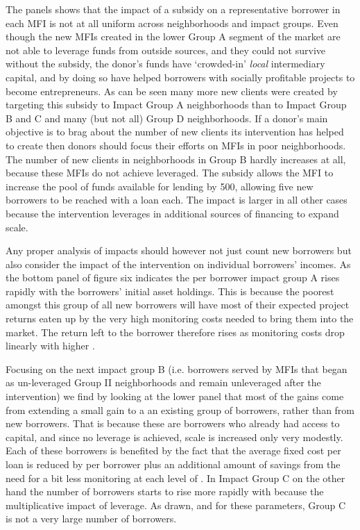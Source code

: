 \documentclass{article}
\begin{document}
The panels shows that the impact of a subsidy on a representative
borrower in each MFI is not at all uniform across neighborhoods and
impact groups. Even though the new MFIs created in the lower Group A
segment of the market are not able to leverage funds from outside
sources, and they could not survive without the subsidy, the donor's
funds have `crowded-in' \emph{local} intermediary capital, and by doing
so have helped borrowers with socially profitable projects to become
entrepreneurs. As can be seen many more new clients were created by
targeting this subsidy to Impact Group A neighborhoods than to Impact
Group B and C and many (but not all) Group D neighborhoods. If a donor's
main objective is to brag about the number of new clients its
intervention has helped to create then donors should focus their efforts
on MFIs in poor neighborhoods. The number of new clients in
neighborhoods in Group B hardly increases at all, because these MFIs do
not achieve leveraged. The subsidy allows the MFI to increase the pool
of funds available for lending by 500, allowing five new borrowers to be
reached with a loan each. The impact is larger in all other cases
because the intervention leverages in additional sources of financing to
expand scale.

Any proper analysis of impacts should however not just count new
borrowers but also consider the impact of the intervention on individual
borrowers' incomes. As the bottom panel of figure six indicates the per
borrower impact group A rises rapidly with the borrowers' initial asset
holdings. This is because the poorest amongst this group of all new
borrowers will have most of their expected project returns eaten up by
the very high monitoring costs needed to bring them into the market. The
return left to the borrower therefore rises as monitoring costs drop
linearly with higher .

Focusing on the next impact group B (i.e. borrowers served by MFIs that
began as un-leveraged Group II neighborhoods and remain unleveraged
after the intervention) we find by looking at the lower panel that most
of the gains come from extending a small gain to a an existing group of
borrowers, rather than from new borrowers. That is because these are
borrowers who already had access to capital, and since no leverage is
achieved, scale is increased only very modestly. Each of these borrowers
is benefited by the fact that the average fixed cost per loan is reduced
by per borrower plus an additional amount of savings from the need for a
bit less monitoring at each level of . In Impact Group C on the other
hand the number of borrowers starts to rise more rapidly with because
the multiplicative impact of leverage. As drawn, and for these
parameters, Group C is not a very large number of borrowers.
\end{document}
